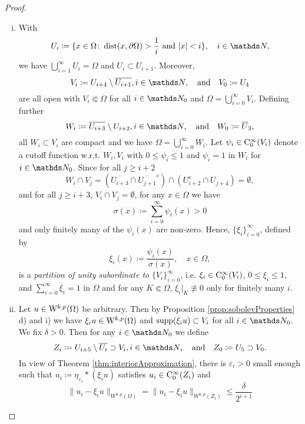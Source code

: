 \begin{proof}
  \begin{enumerate}[i)]
  \item With
    $$
    U_i \coloneqq \{ x \in \Omega \colon \dist(x, \partial \Omega) > \frac{1}{i} \text{ and } |x| < i\}, \quad i \in \N,
    $$
    we have $\bigcup_{i = 1}^\infty U_i = \Omega$ and $U_i \subset U_{i + 1}$.
    Moreover, 
    $$V_i \coloneqq U_{i + 4} \setminus \overline{U_{i + 1}}, i \in \N,\quad\text{and}\quad V_0\coloneqq U_4$$
    are all open with $V_i \Subset \Omega$ for all $i \in \N_0$ and  $\Omega = \bigcup_{i = 0}^\infty V_i$.
    Defining further 
    $$
    W_i \coloneqq \overline{U_{i + 3}} \setminus U_{i + 2}, i \in \N, \quad\text{and}\quad W_0 \coloneqq \overline U_3,
    $$
    all $W_i \subset V_i$ are compact and we have $\Omega = \bigcup_{i = 0}^\infty W_i$.
      Let $\psi_i \in \mathrm{C}_0^\infty(V_i)$ denote a cutoff function w.r.t. $W_i, V_i$ with $0 \leq \psi_i \leq 1$ and $\psi_i = 1$ in $W_i$ for $i \in \N_0$.
    Since for all $j \geq i + 2$
    $$W_i \cap V_j 
    = \left(\overline{U_{i + 3}} \cap \overline{U_{j + 1}}^{\mathrm c}  \right)\cap \left( U_{i + 2}^{\mathrm c} \cap  U_{j + 4}   \right) 
    =  \emptyset,$$ 
    and for all $j \geq i + 3$, $V_i \cap V_j = \emptyset$, for any $x \in \Omega$ we have
    $$
    \sigma(x) \coloneqq \sum_{i = 0}^\infty \psi_i(x) > 0
    $$
    and only finitely many of the $\psi_i(x)$ are non-zero.
    Hence, $\{\xi_i\}_{i = 0}^\infty$, defined by
    $$\xi_i(x) \coloneqq \frac{\psi_i(x)}{\sigma(x)}, \quad x \in \Omega,$$
      is a \emph{partition of unity subordinate to} $\{V_i\}_{i = 0}^\infty$, i.e. $\xi_i \in \mathrm{C}_0^\infty(V_i)$, $0 \leq \xi_i \leq 1$, and $\sum_{i = 0}^\infty \xi_i = 1$ in $\Omega$ and for any $K \Subset \Omega$, $\xi_i|_K \not\equiv 0$ only for finitely many $i$.
  \item Let $u \in \mathrm{W}^{k,p}(\Omega)$ be arbitrary.
    Then by Proposition \ref{prop:sobolevProperties} d) and i) we have $\xi_i u \in \mathrm{W}^{k,p}(\Omega)$ and $\operatorname{supp}(\xi_i u) \subset V_i$ for all $i \in \N_0$.
    We fix $\delta > 0$.
    Then for any $i \in \N_0$ we define
    $$
    Z_i \coloneqq U_{i + 5} \setminus \overline{U_i} \supset V_i, i \in \N, \quad\text{and}\quad Z_0 \coloneqq U_5 \supset V_0.
    $$
    In view of Theorem \ref{thm:interiorApproximation}, there is $\varepsilon_i > 0$ small enough such that $u_i \coloneqq \eta_{\varepsilon_i} \ast (\xi_i u)$ satisfies $u_i \in \mathrm{C}_0^\infty(Z_i)$ and
    \begin{equation}
      \|u_i - \xi_i u \|_{W^{k,p}(\Omega)} = \|u_i - \xi_i u\|_{W^{k,p}(Z_i)} \leq \frac{\delta}{2^{i + 1}}

\end{equation}
\end{enumerate}
\end{proof}
